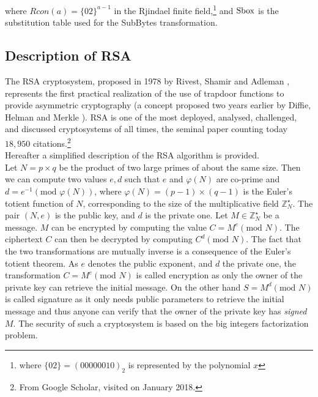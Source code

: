 where $Rcon(a) = \{02\}^{a-1}$ in the Rjindael finite field,\footnote{where $\{02\}=(00000010)_2$ is represented by the polynomial $x$} and $\mathrm{Sbox}$ is the substitution table used for the SubBytes transformation.

\subsection{Description of RSA}
The RSA cryptosystem, proposed in 1978 by Rivest, Shamir and Adleman \cite{rivest1978method}, represents the first practical realization of the use of trapdoor functions to provide asymmetric cryptography (a concept proposed two years earlier by Diffie, Helman and Merkle \cite{diffie1976new}). RSA is one of the most deployed, analysed, challenged, and discussed cryptosystems of all times, the seminal paper \cite{rivest1978method} counting today $18,950$ citations.\footnote{From Google Scholar, visited on January 2018.}\\

Hereafter a simplified description of the RSA algorithm is provided.\\
Let $N = p \times q$ be the product of two large primes of about the same size. Then we can compute two values $e,d$ such that $e$ and $\varphi(N)$ are co-prime and $d = e^{-1} (\mbox{mod } \varphi(N))$, where $\varphi(N) = (p-1)\times(q-1)$ is the Euler's totient function of $N$, corresponding to the size of the multiplicative field $	\mathbb{Z}^\star_N$. The pair $(N,e)$ is the public key, and $d$ is the private one. Let $M \in	\mathbb{Z}^\star_N$ be a message. $M$ can be encrypted by computing the value $C = M^e (\mbox{mod } N)$. The ciphertext $C$ can then be decrypted by computing $C^d (\mbox{mod } N)$. The fact that the two transformations are mutually inverse is a consequence of the Euler's totient theorem. 
As $e$ denotes the public exponent, and $d$ the private one, the transformation $C = M^e (\mbox{mod } N)$ is called encryption as only the owner of the private key can retrieve the initial message. On the other hand $S = M^d (\mbox{mod } N)$ is called signature as it only needs public parameters to retrieve the initial message and thus anyone can verify that the owner of the private key has \emph{signed} $M$. The security of such a cryptosystem is based on the big integers factorization problem.


